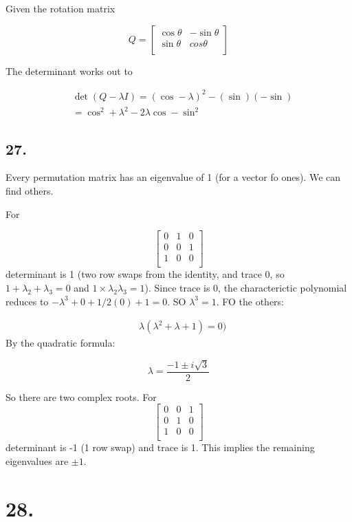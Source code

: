 \documentclass[
]{article}
\begin{document}
Given the rotation matrix

\[Q = \begin{bmatrix}
  \cos \theta & -\sin \theta\\
  \sin \theta & cos \theta\\
\end{bmatrix}\]

The determinant works out to

\[
  \begin{aligned}
    & \det(Q - \lambda I) = (\cos - \lambda)^2 -(\sin)(-\sin)\\
    & = \cos^2 + \lambda^2 - 2 \lambda \cos - \sin^2
  \end{aligned}
\]

\hypertarget{section-24}{%
\subsection{27.}\label{section-24}}

Every permutation matrix has an eigenvalue of 1 (for a vector fo ones).
We can find others.

For

\[ \begin{bmatrix}
  0 & 1 & 0\\
  0 & 0 & 1\\
  1 & 0 & 0\\
\end{bmatrix}\] determinant is 1 (two row swaps from the identity, and
trace 0, so \(1 + \lambda_2 + \lambda_3 =0\) and
\(1\times \lambda_2 \lambda_3=1\)). Since trace is 0, the characterictic
polynomial reduces to \(- \lambda^3 + 0 + 1/2(0) + 1=0\). SO
\(\lambda^3 = 1\). FO the others:

\[
  \begin{aligned}
    & \lambda(\lambda^2 + \lambda +1) = 0)
  \end{aligned}
\] By the quadratic formula:

\[\lambda = \frac{-1 \pm i \sqrt3}{2}\]

So there are two complex roots. For \[ \begin{bmatrix}
  0 & 0 & 1\\
  0 & 1 & 0\\
  1 & 0 & 0\\
\end{bmatrix}\] determinant is -1 (1 row swap) and trace is 1. This
implies the remaining eigenvalues are \(\pm 1\).

\hypertarget{section-25}{%
\section{28.}\label{section-25}}
\end{document}
